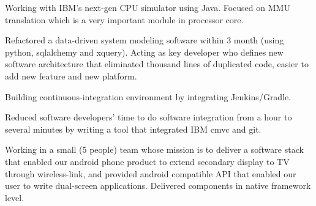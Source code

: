 \documentclass[a4paper]{deedy-resume} %
\begin{document}
\begin{minipage}[t]{0.66\textwidth}
\sectionspace %



\begin{tightitemize}
\item Working with IBM’s next-gen CPU simulator using Java. Focused on MMU translation which is a very important module in processor core.
\item Refactored a data-driven system modeling software within 3 month (using python, sqlalchemy and xquery). Acting as key developer who defines new software architecture that eliminated thousand lines of duplicated code, easier to add new feature and new platform.
\item Building continuous-integration environment by integrating Jenkins/Gradle.
\item Reduced software developers’ time to do software integration from a hour to several minutes by writing a tool that integrated IBM cmvc and git.
\end{tightitemize}

\sectionspace %



\begin{tightitemize}
\item Working in a small (5 people) team whose mission is to deliver a software stack that enabled our android phone product to extend secondary display to TV through wireless-link, and provided android compatible API that enabled our user to write dual-screen applications. Delivered components in native framework level.
\end{tightitemize}

\sectionspace %




\end{minipage}
\end{document}
